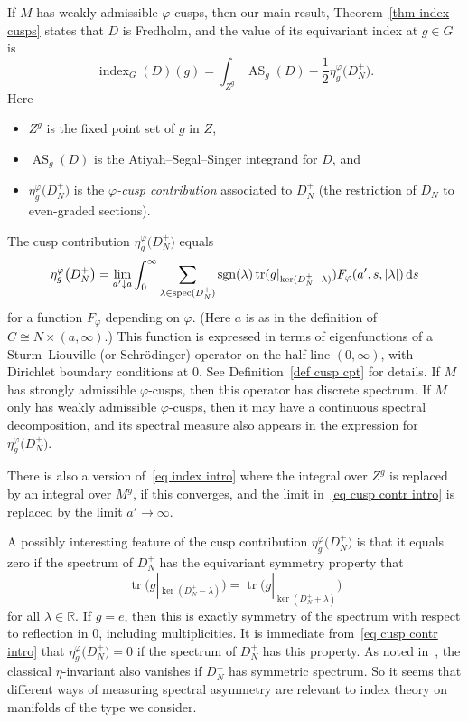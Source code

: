 \documentclass[10pt,a4paper]{amsart}
\numberwithin{equation}{section}
\DeclareMathOperator{\tr}{tr}
\DeclareMathOperator{\spec}{spec}
\DeclareMathOperator{\AS}{AS}
\DeclareMathOperator{\ind}{index}
\DeclareMathOperator{\sgn}{sgn}
\newcommand{\R}{\mathbb{R}}
\begin{document}
If $M$ has weakly admissible $\varphi$-cusps, then our main result, Theorem~\ref{thm index cusps} states that $D$ is Fredholm, and the value of its equivariant index at $g \in G$ is
\begin{equation} \label{eq index intro}
\ind_G(D)(g) = \int_{Z^g} \AS_g(D) - \frac{1}{2}\eta_g^{\varphi}\big(D_N^+\big).
\end{equation}
Here
\begin{itemize}\itemsep=0pt
\item $Z^g$ is the fixed point set of $g$ in $Z$,
\item $\AS_g(D)$ is the Atiyah--Segal--Singer integrand for $D$, and
\item $\eta_g^{\varphi}\big(D_N^+\big)$ is the \emph{$\varphi$-cusp contribution} associated to $D_N^+$ (the restriction of $D_N$ to even-graded sections).
\end{itemize}
The cusp contribution $\eta_g^{\varphi}\big(D_N^+\big)$ equals
\begin{equation} \label{eq cusp contr intro}
\eta^{\varphi}_g\big(D_N^+\big) =
\lim_{a'\downarrow a}
 \int_{0}^{\infty}
\sum_{\lambda \in \spec(D_N^+)}\sgn(\lambda) \tr(g|_{\ker(D_N^+ - \lambda)})
F_{\varphi}(a', s, |\lambda|) \, {\rm d}s
\end{equation}
for a function $F_{\varphi}$ depending on $\varphi$. (Here $a$ is as in the definition of $C \cong N \times (a, \infty)$.) This function is expressed
 in terms of eigenfunctions of a Sturm--Liouville (or Schr\"odinger) operator on the half-line $(0, \infty)$, with Dirichlet boundary conditions at $0$. See Definition~\ref{def cusp cpt} for details. If $M$ has strongly admissible $\varphi$-cusps, then this operator has discrete spectrum. If $M$ only has weakly admissible $\varphi$-cusps, then it may have a continuous spectral decomposition, and its spectral measure also appears in the expression for $\eta_g^{\varphi}\big(D_N^+\big)$.

There is also a version of~\eqref{eq index intro} where the integral over $Z^g$ is replaced by an integral over $M^g$, if this converges, and the limit in~\eqref{eq cusp contr intro} is replaced by the limit $a' \to \infty$.

A possibly interesting feature of the cusp contribution $\eta_g^{\varphi}\big(D_N^+\big)$ is that it equals zero if the spectrum of $D_N^+$
has the equivariant symmetry property that
\begin{equation} \label{eq g symm spec intro}
\tr\big(g|_{\ker(D_N^+ - \lambda)}\big) = \tr\big(g|_{\ker(D_N^+ + \lambda)}\big)
\end{equation}
for all $\lambda \in \R$. If $g=e$, then this is exactly symmetry of the spectrum with respect to reflection in $0$, including multiplicities. It is immediate from~\eqref{eq cusp contr intro} that $\eta^{\varphi}_g\big(D_N^+\big)=0$ if the spectrum of $D_N^+$ has this property.
 As noted in~\cite{APS1}, the classical $\eta$-invariant also vanishes if $D_N^+$ has symmetric spectrum. So it seems that different ways of measuring spectral asymmetry are relevant to index theory on manifolds of the type we consider.
\end{document}
